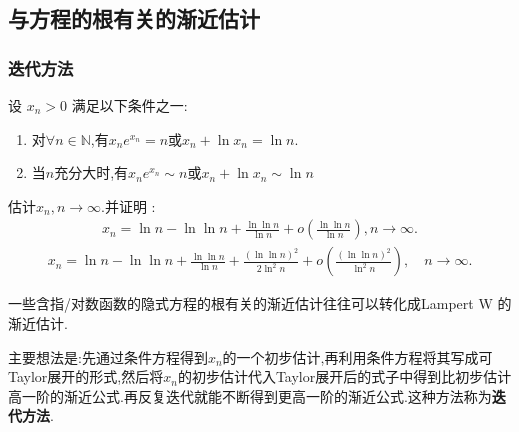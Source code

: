 \documentclass[../../main.tex]{subfiles}%
\begin{document}
\subsection{与方程的根有关的渐近估计}

\subsubsection{迭代方法}

\begin{proposition}\label{proposition:Lampert W 函数的渐近估计}
设 $x_n > 0$ 满足以下条件之一:
\begin{enumerate}[(1)]
\item 对$\forall n\in \mathbb{N}$,有$x_n e^{x_n} = n$或$x_n+\ln x_n=\ln n.$

\item 当$n$充分大时,有$x_n e^{x_n} \sim  n$或$ x_n+\ln x_n\sim \ln n$
\end{enumerate}
估计$x_n,n\to \infty$.并证明 :
\begin{align*}
x_n = \ln n - \ln \ln n + \frac{\ln \ln n}{\ln n} + o\left( \frac{\ln \ln n}{\ln n} \right), n \to \infty.
\end{align*}
\begin{align*}
x_n=\ln n-\ln\ln n+\frac{\ln\ln n}{\ln n}+\frac{\left( \ln\ln n \right) ^2}{2\ln ^2n}+o\left( \frac{\left( \ln\ln n \right) ^2}{\ln ^2n} \right) ,\quad n\rightarrow \infty .
\end{align*}
\end{proposition}
\begin{remark}
一些含指/对数函数的隐式方程的根有关的渐近估计往往可以转化成Lampert W 的渐近估计.
\end{remark}
\begin{note}
主要想法是:先通过条件方程得到$x_n$的一个初步估计,再利用条件方程将其写成可Taylor展开的形式,然后将$x_n$的初步估计代入Taylor展开后的式子中得到比初步估计高一阶的渐近公式.再反复迭代就能不断得到更高一阶的渐近公式.这种方法称为\textbf{迭代方法}.
\end{note}
\end{document}
